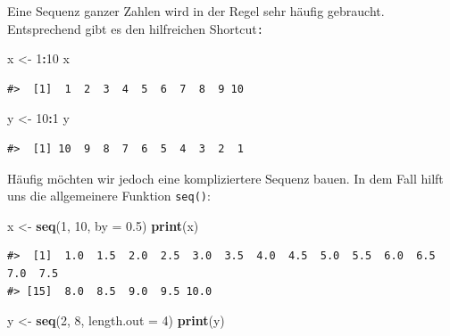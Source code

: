 \documentclass[]{book}
\newenvironment{Shaded}{\begin{snugshade}}{\end{snugshade}}
\newcommand{\KeywordTok}[1]{\textcolor[rgb]{0.13,0.29,0.53}{\textbf{#1}}}
\newcommand{\DataTypeTok}[1]{\textcolor[rgb]{0.13,0.29,0.53}{#1}}
\newcommand{\DecValTok}[1]{\textcolor[rgb]{0.00,0.00,0.81}{#1}}
\newcommand{\FloatTok}[1]{\textcolor[rgb]{0.00,0.00,0.81}{#1}}
\newcommand{\StringTok}[1]{\textcolor[rgb]{0.31,0.60,0.02}{#1}}
\newcommand{\OperatorTok}[1]{\textcolor[rgb]{0.81,0.36,0.00}{\textbf{#1}}}
\newcommand{\NormalTok}[1]{#1}
\begin{document}
Eine Sequenz ganzer Zahlen wird in der Regel sehr häufig gebraucht.
Entsprechend gibt es den hilfreichen Shortcut\texttt{:}

\begin{Shaded}
\begin{Highlighting}[]
\NormalTok{x <-}\StringTok{ }\DecValTok{1}\OperatorTok{:}\DecValTok{10}
\NormalTok{x}
\end{Highlighting}
\end{Shaded}

\begin{verbatim}
#>  [1]  1  2  3  4  5  6  7  8  9 10
\end{verbatim}

\begin{Shaded}
\begin{Highlighting}[]
\NormalTok{y <-}\StringTok{ }\DecValTok{10}\OperatorTok{:}\DecValTok{1}
\NormalTok{y}
\end{Highlighting}
\end{Shaded}

\begin{verbatim}
#>  [1] 10  9  8  7  6  5  4  3  2  1
\end{verbatim}

Häufig möchten wir jedoch eine kompliziertere Sequenz bauen. In dem Fall
hilft uns die allgemeinere Funktion \texttt{seq()}:

\begin{Shaded}
\begin{Highlighting}[]
\NormalTok{x <-}\StringTok{ }\KeywordTok{seq}\NormalTok{(}\DecValTok{1}\NormalTok{, }\DecValTok{10}\NormalTok{, }\DataTypeTok{by =} \FloatTok{0.5}\NormalTok{)}
\KeywordTok{print}\NormalTok{(x)}
\end{Highlighting}
\end{Shaded}

\begin{verbatim}
#>  [1]  1.0  1.5  2.0  2.5  3.0  3.5  4.0  4.5  5.0  5.5  6.0  6.5  7.0  7.5
#> [15]  8.0  8.5  9.0  9.5 10.0
\end{verbatim}

\begin{Shaded}
\begin{Highlighting}[]
\NormalTok{y <-}\StringTok{ }\KeywordTok{seq}\NormalTok{(}\DecValTok{2}\NormalTok{, }\DecValTok{8}\NormalTok{, }\DataTypeTok{length.out =} \DecValTok{4}\NormalTok{)}
\KeywordTok{print}\NormalTok{(y)}
\end{Highlighting}
\end{Shaded}
\end{document}
